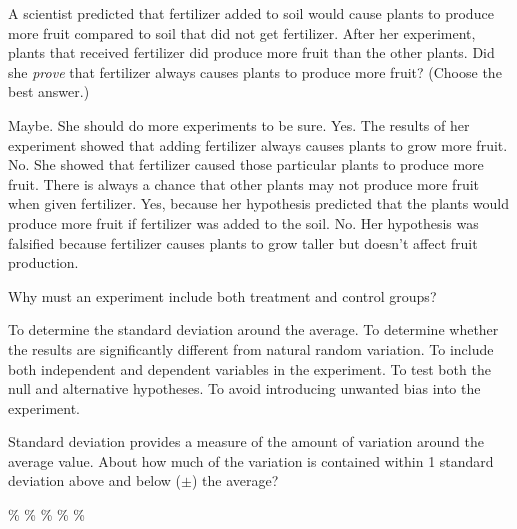 \question
A scientist predicted that fertilizer added to soil would cause plants to produce more fruit compared to soil that did not get fertilizer. After her experiment, plants that received fertilizer did produce more fruit than the other plants. Did she \emph{prove} that fertilizer always causes plants to produce more fruit? (Choose the best answer.)

\begin{choices}
\choice Maybe. She should do more experiments to be sure.
\choice Yes. The results of her experiment showed that adding fertilizer always causes plants to grow more fruit.
\correctchoice No. She showed that fertilizer caused those particular plants to produce more fruit. There is always a chance that other plants may not produce more fruit when given fertilizer.
\choice Yes, because her hypothesis predicted that the plants would produce more fruit if fertilizer was added to the soil.
\choice No. Her hypothesis was falsified because fertilizer causes plants to grow taller but doesn't affect fruit production.
\end{choices}

\question
Why must an experiment include both treatment and control groups?

\begin{choices}
\choice To determine the standard deviation around the average.
\correctchoice To determine whether the results are significantly different from natural random variation.
\choice To include both independent and dependent variables in the experiment.
\choice To test both the null and alternative hypotheses.
\choice To avoid introducing unwanted bias into the experiment.
\end{choices}

\question
Standard deviation provides a measure of the amount of variation around the average value. About how much of the variation is contained within 1 standard deviation above and below ($\pm$) the average?

\begin{choices}
\%
\%
\%
\%
\%
\end{choices}


